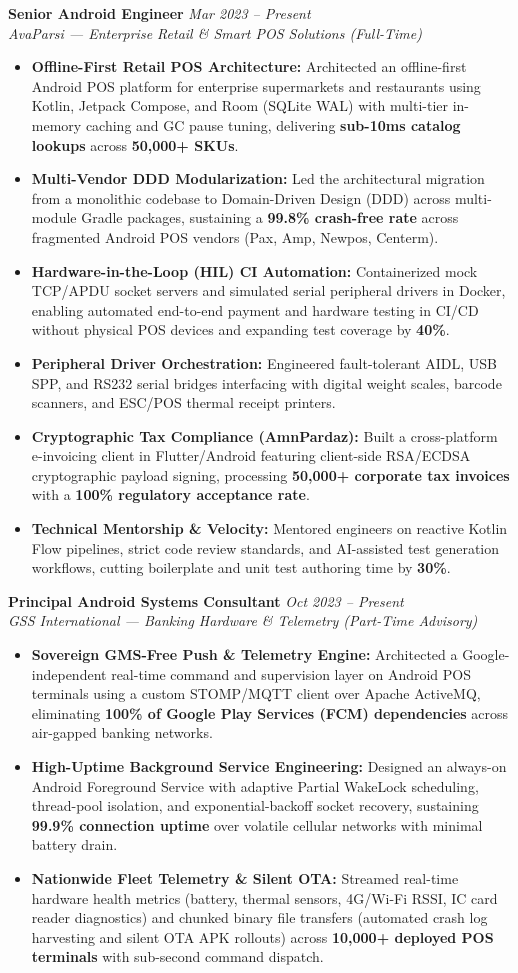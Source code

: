 \documentclass[letterpaper,10pt]{article}
\newcommand{\resumeItem}[1]{
  \item\small{#1}
}
\newcommand{\jobEntry}[4]{
  \textbf{#1} \hfill \textit{\small\color{lightgray}#3 -- #4} \\
  \textit{\small\color{lightgray}#2}
}
\begin{document}
\jobEntry{Senior Android Engineer}{AvaParsi — Enterprise Retail \& Smart POS Solutions (Full-Time)}{Mar 2023}{Present}
\begin{itemize}
  \resumeItem{\textbf{Offline-First Retail POS Architecture:} Architected an offline-first Android POS platform for enterprise supermarkets and restaurants using Kotlin, Jetpack Compose, and Room (SQLite WAL) with multi-tier in-memory caching and GC pause tuning, delivering \textbf{sub-10ms catalog lookups} across \textbf{50,000+ SKUs}.}
  \resumeItem{\textbf{Multi-Vendor DDD Modularization:} Led the architectural migration from a monolithic codebase to Domain-Driven Design (DDD) across multi-module Gradle packages, sustaining a \textbf{99.8\% crash-free rate} across fragmented Android POS vendors (Pax, Amp, Newpos, Centerm).}
  \resumeItem{\textbf{Hardware-in-the-Loop (HIL) CI Automation:} Containerized mock TCP/APDU socket servers and simulated serial peripheral drivers in Docker, enabling automated end-to-end payment and hardware testing in CI/CD without physical POS devices and expanding test coverage by \textbf{40\%}.}
  \resumeItem{\textbf{Peripheral Driver Orchestration:} Engineered fault-tolerant AIDL, USB SPP, and RS232 serial bridges interfacing with digital weight scales, barcode scanners, and ESC/POS thermal receipt printers.}
  \resumeItem{\textbf{Cryptographic Tax Compliance (AmnPardaz):} Built a cross-platform e-invoicing client in Flutter/Android featuring client-side RSA/ECDSA cryptographic payload signing, processing \textbf{50,000+ corporate tax invoices} with a \textbf{100\% regulatory acceptance rate}.}
  \resumeItem{\textbf{Technical Mentorship \& Velocity:} Mentored engineers on reactive Kotlin Flow pipelines, strict code review standards, and AI-assisted test generation workflows, cutting boilerplate and unit test authoring time by \textbf{30\%}.}
\end{itemize}

\vspace{3pt}
\jobEntry{Principal Android Systems Consultant}{GSS International — Banking Hardware \& Telemetry (Part-Time Advisory)}{Oct 2023}{Present}
\begin{itemize}
  \resumeItem{\textbf{Sovereign GMS-Free Push \& Telemetry Engine:} Architected a Google-independent real-time command and supervision layer on Android POS terminals using a custom STOMP/MQTT client over Apache ActiveMQ, eliminating \textbf{100\% of Google Play Services (FCM) dependencies} across air-gapped banking networks.}
  \resumeItem{\textbf{High-Uptime Background Service Engineering:} Designed an always-on Android Foreground Service with adaptive Partial WakeLock scheduling, thread-pool isolation, and exponential-backoff socket recovery, sustaining \textbf{99.9\% connection uptime} over volatile cellular networks with minimal battery drain.}
  \resumeItem{\textbf{Nationwide Fleet Telemetry \& Silent OTA:} Streamed real-time hardware health metrics (battery, thermal sensors, 4G/Wi-Fi RSSI, IC card reader diagnostics) and chunked binary file transfers (automated crash log harvesting and silent OTA APK rollouts) across \textbf{10,000+ deployed POS terminals} with sub-second command dispatch.}
\end{itemize}
\end{document}
